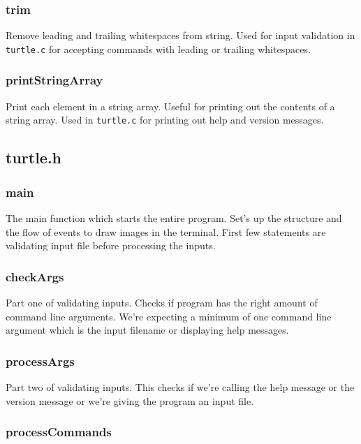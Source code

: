 \documentclass[a4paper, 12pt, titlepage]{article}
\newcommand{\code}[1]{\small\texttt{#1}\normalsize}
\begin{document}
\subsubsection{trim}

Remove leading and trailing whitespaces from string. Used for input 
validation in \code{turtle.c} for accepting commands with leading or trailing 
whitespaces.

\subsubsection{printStringArray}

Print each element in a string array. Useful for printing out the contents 
of a string array. Used in \code{turtle.c} for printing out help and version 
messages.

\pagebreak
\subsection{turtle.h}
\subsubsection{main}

The main function which starts the entire program. Set's up the structure 
and the flow of events to draw images in the terminal. First few statements 
are validating input file before processing the inputs.

\subsubsection{checkArgs}

Part one of validating inputs. Checks if program has the right amount of 
command line arguments. We're expecting a minimum of one command line 
argument which is the input filename or displaying help messages.

\subsubsection{processArgs}

Part two of validating inputs. This checks if we're calling the help message 
or the version message or we're giving the program an input file.

\subsubsection{processCommands}
\end{document}
